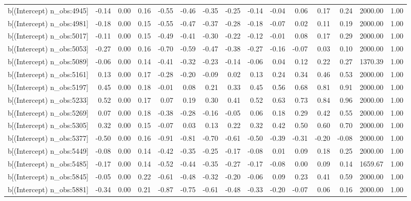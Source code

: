 \begin{table}[ht]
\begin{tabular}{rrrrrrrrrrrrrrr}
  b[(Intercept) n\_obs:4945] & -0.14 & 0.00 & 0.16 & -0.55 & -0.46 & -0.35 & -0.25 & -0.14 & -0.04 & 0.06 & 0.17 & 0.24 & 2000.00 & 1.00 \\ 
  b[(Intercept) n\_obs:4981] & -0.18 & 0.00 & 0.15 & -0.55 & -0.47 & -0.37 & -0.28 & -0.18 & -0.07 & 0.02 & 0.11 & 0.19 & 2000.00 & 1.00 \\ 
  b[(Intercept) n\_obs:5017] & -0.11 & 0.00 & 0.15 & -0.49 & -0.41 & -0.30 & -0.22 & -0.12 & -0.01 & 0.08 & 0.17 & 0.29 & 2000.00 & 1.00 \\ 
  b[(Intercept) n\_obs:5053] & -0.27 & 0.00 & 0.16 & -0.70 & -0.59 & -0.47 & -0.38 & -0.27 & -0.16 & -0.07 & 0.03 & 0.10 & 2000.00 & 1.00 \\ 
  b[(Intercept) n\_obs:5089] & -0.06 & 0.00 & 0.14 & -0.41 & -0.32 & -0.23 & -0.14 & -0.06 & 0.04 & 0.12 & 0.22 & 0.27 & 1370.39 & 1.00 \\ 
  b[(Intercept) n\_obs:5161] & 0.13 & 0.00 & 0.17 & -0.28 & -0.20 & -0.09 & 0.02 & 0.13 & 0.24 & 0.34 & 0.46 & 0.53 & 2000.00 & 1.00 \\ 
  b[(Intercept) n\_obs:5197] & 0.45 & 0.00 & 0.18 & -0.01 & 0.08 & 0.21 & 0.33 & 0.45 & 0.56 & 0.68 & 0.81 & 0.91 & 2000.00 & 1.00 \\ 
  b[(Intercept) n\_obs:5233] & 0.52 & 0.00 & 0.17 & 0.07 & 0.19 & 0.30 & 0.41 & 0.52 & 0.63 & 0.73 & 0.84 & 0.96 & 2000.00 & 1.00 \\ 
  b[(Intercept) n\_obs:5269] & 0.07 & 0.00 & 0.18 & -0.38 & -0.28 & -0.16 & -0.05 & 0.06 & 0.18 & 0.29 & 0.42 & 0.55 & 2000.00 & 1.00 \\ 
  b[(Intercept) n\_obs:5305] & 0.32 & 0.00 & 0.15 & -0.07 & 0.03 & 0.13 & 0.22 & 0.32 & 0.42 & 0.50 & 0.60 & 0.70 & 2000.00 & 1.00 \\ 
  b[(Intercept) n\_obs:5377] & -0.50 & 0.00 & 0.16 & -0.91 & -0.81 & -0.70 & -0.61 & -0.50 & -0.39 & -0.31 & -0.20 & -0.08 & 2000.00 & 1.00 \\ 
  b[(Intercept) n\_obs:5449] & -0.08 & 0.00 & 0.14 & -0.42 & -0.35 & -0.25 & -0.17 & -0.08 & 0.01 & 0.09 & 0.18 & 0.25 & 2000.00 & 1.00 \\ 
  b[(Intercept) n\_obs:5485] & -0.17 & 0.00 & 0.14 & -0.52 & -0.44 & -0.35 & -0.27 & -0.17 & -0.08 & 0.00 & 0.09 & 0.14 & 1659.67 & 1.00 \\ 
  b[(Intercept) n\_obs:5845] & -0.05 & 0.00 & 0.22 & -0.61 & -0.48 & -0.32 & -0.20 & -0.06 & 0.09 & 0.23 & 0.41 & 0.59 & 2000.00 & 1.00 \\ 
  b[(Intercept) n\_obs:5881] & -0.34 & 0.00 & 0.21 & -0.87 & -0.75 & -0.61 & -0.48 & -0.33 & -0.20 & -0.07 & 0.06 & 0.16 & 2000.00 & 1.00 \\ 

\end{tabular}
\end{table}
